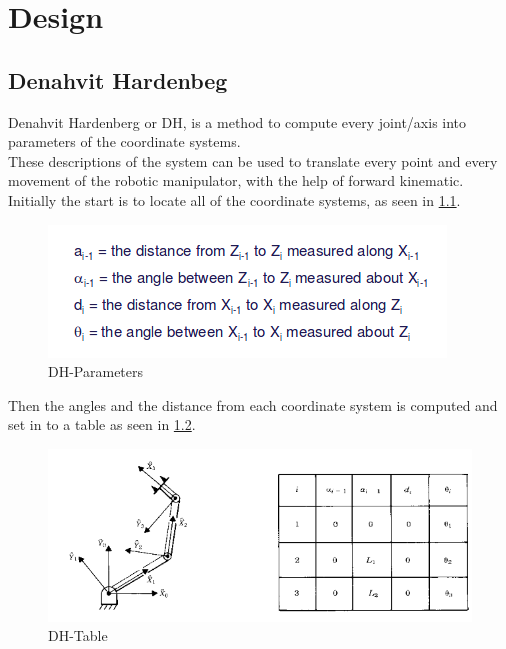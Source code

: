 \chapter{Design}

\section{Denahvit Hardenbeg}

Denahvit Hardenberg or DH, is a method to compute every joint/axis into parameters of the coordinate systems.\\
These descriptions of the system can be used to translate every point and every movement of the robotic manipulator, with the help of forward kinematic.\\
Initially the start is to locate all of the coordinate systems, as seen in \ref{fig:DH-Parameters}.\\ 
\begin{figure}[h]
    \centering
    \includegraphics[scale=0.65]{Design/DH.png}
    \caption{DH-Parameters \cite{DH}} 
    \label{fig:DH-Parameters} 
\end{figure}

\newpage

Then the angles and the distance from each coordinate system is computed and set in to a table as seen in \ref{fig:DH-Table}.

\begin{figure}[h]
    \centering
    \includegraphics[scale=0.5]{Design/DH1.png}
    \caption{DH-Table \cite{DH}} 
    \label{fig:DH-Table} 
\end{figure}

